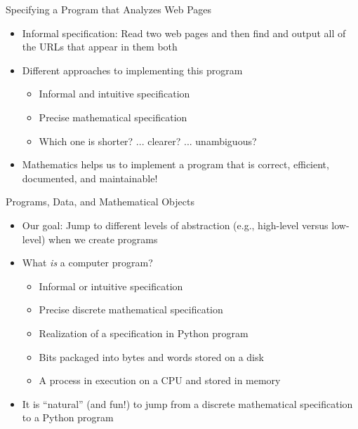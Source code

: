 \documentclass[14pt,aspectratio=169]{beamer}
\begin{document}
%
\begin{frame}{Specifying a Program that Analyzes Web Pages}
  \begin{itemize}
    \item Informal specification: Read two web pages and then find and output
      all of the URLs that appear in them both
    \item Different approaches to implementing this program
      \begin{itemize}
        \item Informal and intuitive specification
        \item Precise mathematical specification
        \item Which one is shorter? ... clearer? ... unambiguous?
      \end{itemize}
    \item Mathematics helps us to implement a program that is correct,
      efficient, documented, and maintainable!
  \end{itemize}
\end{frame}

%
\begin{frame}{Programs, Data, and Mathematical Objects}
  \begin{itemize}
    \item Our goal: Jump to different levels of abstraction (e.g., high-level
      versus low-level) when we create programs
      \vspace*{-.1in}
    \item What {\em is} a computer program?
      \begin{itemize}
        \item Informal or intuitive specification
        \item Precise discrete mathematical specification
        \item Realization of a specification in Python program
        \item Bits packaged into bytes and words stored on a disk
        \item A process in execution on a CPU and stored in memory
      \end{itemize}
      \vspace*{-.1in}
    \item It is ``natural'' (and fun!) to jump from a discrete mathematical
      specification to a Python program
  \end{itemize}
\end{frame}
\end{document}
